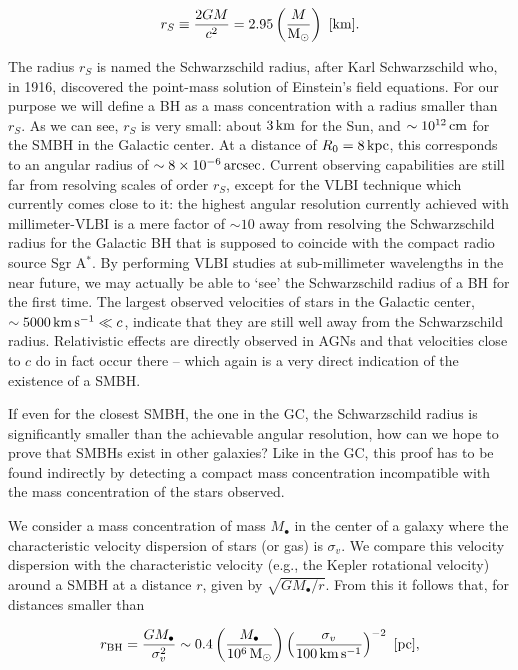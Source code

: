 \documentclass[a4paper,11pt]{article}
\begin{document}
\begin{align*}
    r_S \equiv \frac{2GM}{c^2} = 2.95\left(\frac{M}{{\rm M_\odot}}\right) ~ [{\rm km}].
\end{align*}

{\noindent}The radius $r_S$ is named the Schwarzschild radius, after Karl Schwarzschild who, in 1916, discovered the point-mass solution of Einstein's field equations. For our purpose we will define a BH as a mass concentration with a radius smaller than $r_S$. As we can see, $r_S$ is very small: about $3\,{\rm km}$ for the Sun, and $\sim10^{12}\,{\rm cm}$ for the SMBH in the Galactic center. At a distance of $R_0=8\,{\rm kpc}$, this corresponds to an angular radius of $\sim8\times10^{-6}\,{\rm arcsec}$. Current observing capabilities are still far from resolving scales of order $r_S$, except for the VLBI technique which currently comes close to it: the highest angular resolution currently achieved with millimeter-VLBI is a mere factor of $\sim10$ away from resolving the Schwarzschild radius for the Galactic BH that is supposed to coincide with the compact radio source Sgr A$^*$. By performing VLBI studies at sub-millimeter wavelengths in the near future, we may actually be able to `see' the Schwarzschild radius of a BH for the first time. The largest observed velocities of stars in the Galactic center,   $\sim5000\,{\rm km\,s^{-1}}\ll c$, indicate that they are still well away from the Schwarzschild radius. Relativistic effects are directly observed in AGNs and that velocities close to $c$ do in fact occur there -- which again is a very direct indication of the existence of a SMBH.

{\noindent}If even for the closest SMBH, the one in the GC, the Schwarzschild radius is significantly smaller than the achievable angular resolution, how can we hope to prove that SMBHs exist in other galaxies? Like in the GC, this proof has to be found indirectly by detecting a compact mass concentration incompatible with the mass concentration of the stars observed.

{\noindent}We consider a mass concentration of mass $M_\bullet$ in the center of a galaxy where the characteristic velocity dispersion of stars (or gas) is $\sigma_v$. We compare this velocity dispersion with the characteristic velocity (e.g., the Kepler rotational velocity) around a SMBH at a distance $r$, given by $\sqrt{GM_\bullet/r}$. From this it follows that, for distances smaller than

\begin{align*}
    r_\mathrm{BH} = \frac{GM_\bullet}{\sigma_v^2} \sim 0.4\left(\frac{M_\bullet}{10^6\,{\rm M_\odot}}\right)\left(\frac{\sigma_v}{100\,{\rm km\,s^{-1}}}\right)^{-2} ~ [{\rm pc}],
\end{align*}
\end{document}
